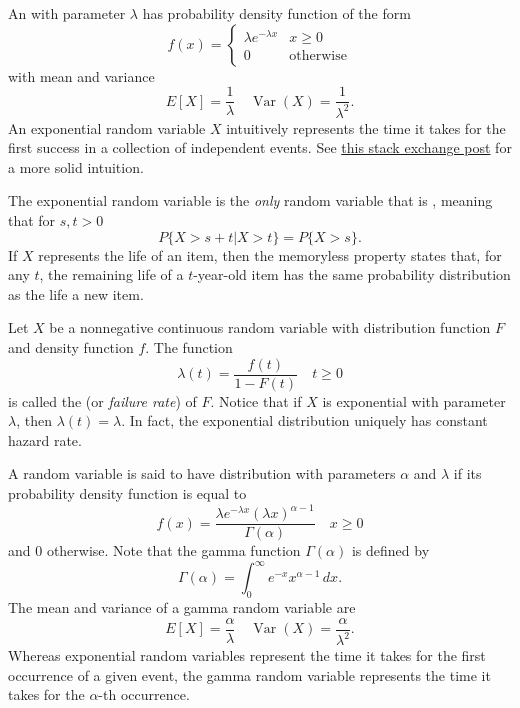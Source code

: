 \documentclass{article}
\DeclareMathOperator{\Var}{\textrm{Var}}
\begin{document}
\begin{definition}
    An  with parameter $\lambda$ has probability density function of the form 
    \[f(x)=\begin{cases}
        \lambda e^{-\lambda x} & x\geq 0\\
        0 & \textrm{otherwise}
    \end{cases}\]with mean and variance
    \[E[X]=\frac{1}{\lambda}\quad \Var(X)=\frac{1}{\lambda^{2}}.\]
    An exponential random variable $X$ intuitively represents the time it takes for the first success in a collection of independent events. See \href{https://math.stackexchange.com/questions/1088111/what-is-the-intuition-behind-the-exponential-distribution}{this stack exchange post} for a more solid intuition.
\end{definition}
\begin{remark}
    The exponential random variable is the \textit{only} random variable that is , meaning that for $s,t>0$
    \[P\{X>s+t|X>t\}=P\{X>s\}.\]If $X$ represents the life of an item, then the memoryless property states that, for any $t$, the remaining life of a $t$-year-old item has the same probability distribution as the life a new item. 
\end{remark}
\begin{definition}
    Let $X$ be a nonnegative continuous random variable with distribution function $F$ and density function $f$. The function 
    \[\lambda(t)=\frac{f(t)}{1-F(t)}\quad t\geq0\]is called the  (or \textit{failure rate}) of $F$. Notice that if $X$ is exponential with parameter $\lambda$, then $\lambda(t)=\lambda$. In fact, the exponential distribution uniquely has constant hazard rate.
\end{definition}

\begin{definition}
    A random variable is said to have  distribution with parameters $\alpha$ and $\lambda$ if its probability density function is equal to 
    \[f(x)=\frac{\lambda e^{-\lambda x}(\lambda x)^{\alpha-1}}{\Gamma(\alpha)}\quad x\geq 0\] and 0 otherwise. Note that the gamma function $\Gamma(\alpha)$ is defined by
    \[\Gamma(\alpha)=\int_{0}^{\infty}e^{-x}x^{\alpha-1}\,dx.\]The mean and variance of a gamma random variable are 
    \[E[X]=\frac{\alpha}{\lambda}\quad \Var(X)=\frac{\alpha}{\lambda^{2}}.\]
    Whereas exponential random variables represent the time it takes for the first occurrence of a given event, the gamma random variable represents the time it takes for the $\alpha$-th occurrence.
\end{definition}
\newpage
\end{document}
